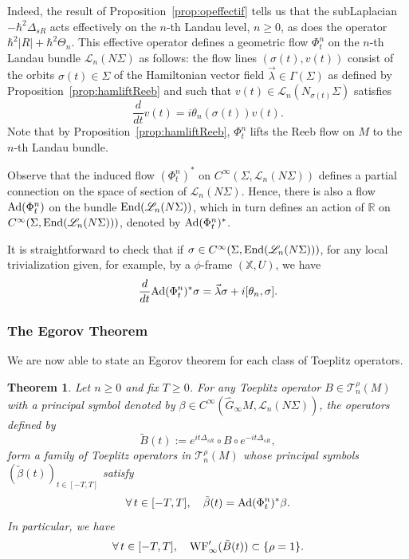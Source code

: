 \documentclass[12pt,a4paper]{amsart}
\theoremstyle{plain}
\newtheorem{theorem}{Theorem}[section]
\theoremstyle{definition}
\theoremstyle{remark}
\numberwithin{equation}{section}
\theoremstyle{definition}
\def\R{{\mathbb R}}%
\def \bX{\mathbb{X}}
\def \Ghat{\widehat{G}}
\numberwithin{equation}{section}
\begin{document}
Indeed, the result of Proposition~\ref{prop:opeffectif} tells us that the subLaplacian $-\hbar^2\Delta_{sR}$ acts effectively on the $n$-th Landau level, $n\geq 0$, as does the  operator $\hbar^2|R| + \hbar^2\Theta_n$. This effective operator defines a geometric flow $\Phi^n_t$ on the $n$-th Landau bundle $\mathscr{L}_n(N\Sigma)$ as follows: the flow lines $(\sigma(t),v(t))$ consist of the orbits $\sigma(t)\in\Sigma$ of the Hamiltonian vector field $\vec{\lambda}\in\Gamma(\Sigma)$ as defined by Proposition~\ref{prop:hamliftReeb} and such that $v(t)\in\mathscr{L}_n(N_{\sigma(t)}\Sigma)$ satisfies 
\begin{equation*}
    \frac{d}{dt}v(t) = i\theta_n(\sigma(t))v(t).
\end{equation*}
Note that by Proposition~\ref{prop:hamliftReeb}, $\Phi^n_t$ lifts the Reeb flow on $M$ to the $n$-th Landau bundle.

Observe that the induced flow $(\Phi^n_t)^*$ on $C^\infty(\Sigma,\mathscr{L}_n(N\Sigma))$ defines a partial connection on the space of section of $\mathscr{L}_n(N\Sigma)$. Hence, there is also a flow ${\rm Ad}(\Phi^n_t)$ on the bundle ${\rm End}(\mathscr{L}_n(N\Sigma))$, which in turn defines an action of $\R$ on $C^\infty(\Sigma,{\rm End}(\mathscr{L}_n(N\Sigma)))$, denoted by ${\rm Ad}(\Phi^n_t)^*$.

It is straightforward to check that if $\sigma\in C^\infty(\Sigma,{\rm End}(\mathscr{L}_n(N\Sigma)))$, for any local trivialization given, for example, by a $\phi$-frame $(\bX,U)$, we have
\begin{equation}
    \label{eq:connectionLandau}
    \frac{d}{dt}{\rm Ad}(\Phi^n_t)^*\sigma = \vec{\lambda}\sigma + i[\theta_n,\sigma].
\end{equation}

\subsubsection{The Egorov Theorem}

We are now able to state an Egorov theorem for each class of Toeplitz operators.

\begin{theorem}
    \label{thm:Egorov}
    Let $n\geq 0$ and fix $T\geq 0$. For any Toeplitz operator $B\in \mathscr{T}_n^\rho(M)$ with a principal symbol denoted by $\beta\in C^\infty(\Ghat_\infty M, \mathscr{L}_n(N\Sigma))$, the operators defined by
    \begin{equation*}
        \tilde{B}(t) := e^{it\Delta_{sR}} \circ B\circ e^{-it\Delta_{sR}},
    \end{equation*}
    form a family of Toeplitz operators in $\mathscr{T}_n^\rho(M)$ whose principal symbols $(\tilde{\beta}(t))_{t\in[-T,T]}$ satisfy
    \begin{equation*}
        \forall\,t\in[-T,T],\quad \tilde{\beta}(t) = {\rm Ad}(\Phi^n_t)^* \beta.
    \end{equation*}
    In particular, we have
    \begin{equation*}
        \forall\,t\in[-T,T],\quad{\rm WF}'_\infty(\tilde{B}(t))\subset \{\rho = 1\}.
    \end{equation*}
\end{theorem}
\end{document}
